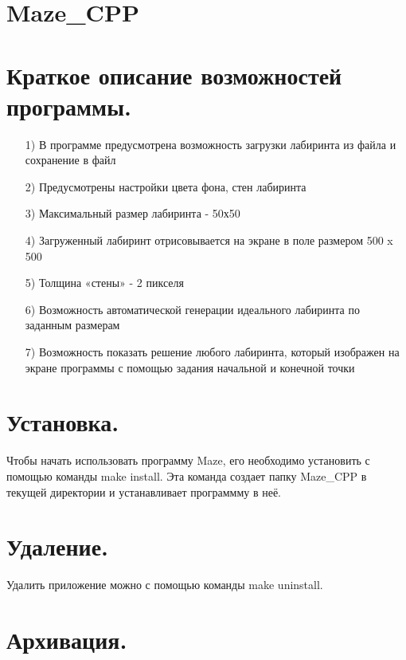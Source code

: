 \documentclass{report}
\begin{document}
\section* {\bfseries Maze\_CPP}
\section* {\bfseries Краткое описание возможностей программы.}
\begin{itemize}
\item[1)] В программе предусмотрена возможность загрузки лабиринта из файла и сохранение в файл

\item[2)] Предусмотрены настройки цвета фона, стен лабиринта

\item[3)] Максимальный размер лабиринта - 50х50

\item[4)] Загруженный лабиринт отрисовывается на экране в поле размером 500 x 500

\item[5)] Толщина «стены» - 2 пикселя

\item[6)] Возможность автоматической генерации идеального лабиринта по заданным размерам

\item[7)] Возможность показать решение любого лабиринта, который изображен на экране программы с помощью задания начальной и конечной точки
\end{itemize}
\section* {\bfseries Установка.}

Чтобы начать использовать программу Maze, его необходимо установить с помощью команды make install. Эта команда создает папку Maze\_CPP в текущей директории и устанавливает программму в неё.

\section* {\bfseries Удаление.}

Удалить приложение можно с помощью команды make uninstall.

\section* {\bfseries Архивация.}
\end{document}
